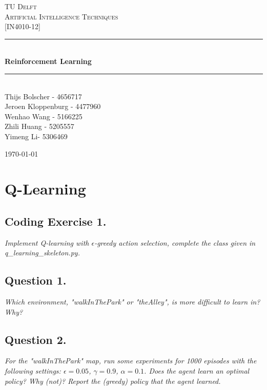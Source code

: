 \documentclass{report}
\newcommand{\divider}{\rule{\linewidth}{0.5mm}}
\newcommand{\q}[1]{\color{gray}\textit{#1}\color{black}}
\begin{document}
	\begin{titlepage}
		\vfill
		\begin{center}
			\textsc{\LARGE TU Delft}\\[1.5cm]
			\textsc{\Large Artificial Intelligence Techniques}\\[0.5cm]
			\textsc{\large [IN4010-12]}\\[0.5cm]
			
			\divider \\[0.4cm]
			{ \huge \bfseries
				Reinforcement Learning
			}\\[0.4cm]
			\divider \\[1.5cm]
			
			\large
			Thijs Bolscher - 4656717\\
			Jeroen Kloppenburg - 4477960\\
			Wenhao Wang - 5166225\\
			Zhili Huang - 5205557\\
			Yimeng Li- 5306469
			\vfill
			
			{\large \today}\\[3cm]
		\end{center}
	\end{titlepage}

	\section*{Q-Learning}
		
		\subsection*{Coding Exercise 1.}
		\q{Implement Q-learning with $\epsilon$-greedy action selection, complete the class given in q\_learning\_skeleton.py.}
		
		\subsection*{Question 1.}
		\q{Which environment, "walkInThePark" or "theAlley", is more difficult to learn in? Why?}
		
		\subsection*{Question 2.}
		\q{For the "walkInThePark" map, run some experiments for 1000 episodes with the following settings: $\epsilon = 0.05$, $\gamma = 0.9$, $\alpha = 0.1$. Does the agent learn an optimal policy? Why (not)? Report the (greedy) policy that the agent learned.}
		
\end{document}
